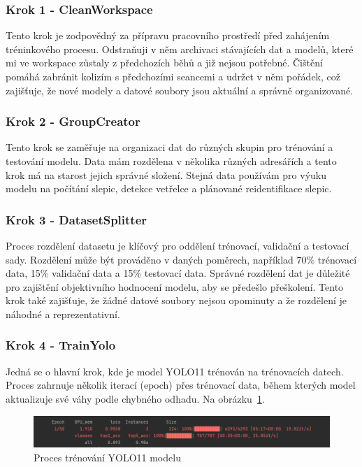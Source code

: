 \subsubsection*{Krok 1 - CleanWorkspace}
Tento krok je zodpovědný za přípravu pracovního prostředí před zahájením tréninkového procesu.
Odstraňuji v něm archivaci stávajících dat a modelů, které mi ve workspace zůstaly z předchozích běhů a již nejsou potřebné.
Čištění pomáhá zabránit kolizím s předchozími seancemi a udržet v něm pořádek, což zajišťuje, že nové modely a datové soubory jsou aktuální a správně organizované.

\subsubsection*{Krok 2 - GroupCreator}

Tento krok se zaměřuje na organizaci dat do různých skupin pro trénování a testování modelu.
Data mám rozdělena v několika různých adresářích a tento krok má na starost jejich správné složení.
Stejná data používám pro výuku modelu na počítání slepic, detekce vetřelce a plánované reidentifikace slepic.

\subsubsection*{Krok 3 - DatasetSplitter}

Proces rozdělení datasetu je klíčový pro oddělení trénovací, validační a testovací sady.
Rozdělení může být prováděno v daných poměrech, například 70\% trénovací data, 15\% validační data a 15\% testovací data.
Správné rozdělení dat je důležité pro zajištění objektivního hodnocení modelu, aby se předešlo přeškolení.
Tento krok také zajišťuje, že žádné datové soubory nejsou opominuty a že rozdělení je náhodné a reprezentativní.

\subsubsection*{Krok 4 - TrainYolo}

Jedná se o hlavní krok, kde je model YOLO11 trénován na trénovacích datech.
Proces zahrnuje několik iterací (epoch) přes trénovací data, během kterých model aktualizuje své váhy podle chybného odhadu.
Na obrázku~\ref{fig:train_yolo}.


\begin{figure}[htbp]
    \centering
    \includegraphics[width=1.0\textwidth]{img/train_yolo}
    \caption{Proces trénování YOLO11 modelu}
    \label{fig:train_yolo}
\end{figure}

